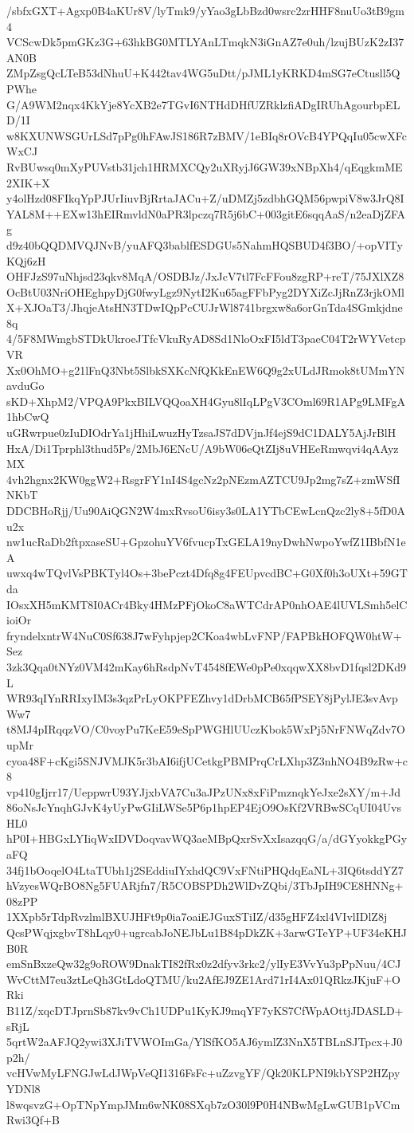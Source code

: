/sbfxGXT+Agxp0B4aKUr8V/lyTmk9/yYao3gLbBzd0wsrc2zrHHF8nuUo3tB9gm4
VCScwDk5pmGKz3G+63hkBG0MTLYAnLTmqkN3iGnAZ7e0uh/lzujBUzK2zI37AN0B
ZMpZsgQcLTeB53dNhuU+K442tav4WG5uDtt/pJML1yKRKD4mSG7eCtusll5QPWhe
G/A9WM2nqx4KkYje8YcXB2e7TGvI6NTHdDHfUZRklzfiADgIRUhAgourbpELD/1I
w8KXUNWSGUrLSd7pPg0hFAwJS186R7zBMV/1eBIq8rOVcB4YPQqIu05cwXFcWxCJ
RvBUwsq0mXyPUVstb31jch1HRMXCQy2uXRyjJ6GW39xNBpXh4/qEqgkmME2XIK+X
y4olHzd08FIkqYpPJUrIiuvBjRrtaJACu+Z/uDMZj5zdbhGQM56pwpiV8w3JrQ8I
YAL8M++EXw13hEIRmvldN0aPR3lpczq7R5j6bC+003gitE6sqqAaS/n2eaDjZFAg
d9z40bQQDMVQJNvB/yuAFQ3bablfESDGUs5NahmHQSBUD4f3BO/+opVITyKQj6zH
OHFJzS97uNhjsd23qkv8MqA/OSDBJz/JxJcV7tl7FcFFou8zgRP+reT/75JXlXZ8
OcBtU03NriOHEghpyDjG0fwyLgz9NytI2Ku65agFFbPyg2DYXiZcJjRnZ3rjkOMl
X+XJOaT3/JhqjeAtsHN3TDwIQpPcCUJrWl8741brgxw8a6orGnTda4SGmkjdne8q
4/5F8MWmgbSTDkUkroeJTfcVkuRyAD8Sd1NloOxFI5ldT3paeC04T2rWYVetcpVR
Xx0OhMO+g21lFnQ3Nbt5SlbkSXKcNfQKkEnEW6Q9g2xULdJRmok8tUMmYNavduGo
sKD+XhpM2/VPQA9PkxBILVQQoaXH4Gyu8lIqLPgV3COml69R1APg9LMFgA1hbCwQ
uGRwrpue0zIuDIOdrYa1jHhiLwuzHyTzsaJS7dDVjnJf4ejS9dC1DALY5AjJrBlH
HxA/Di1Tprphl3thud5Ps/2MbJ6ENcU/A9bW06eQtZIj8uVHEeRmwqvi4qAAyzMX
4vh2hgnx2KW0ggW2+RsgrFY1nI4S4gcNz2pNEzmAZTCU9Jp2mg7sZ+zmWSfINKbT
DDCBHoRjj/Uu90AiQGN2W4mxRvsoU6isy3s0LA1YTbCEwLcnQzc2ly8+5fD0Au2x
nw1ucRaDb2ftpxaseSU+GpzohuYV6fvucpTxGELA19nyDwhNwpoYwfZ1IBbfN1eA
uwxq4wTQvlVsPBKTyl4Os+3bePczt4Dfq8g4FEUpvcdBC+G0Xf0h3oUXt+59GTda
IOsxXH5mKMT8I0ACr4Bky4HMzPFjOkoC8aWTCdrAP0nhOAE4lUVLSmh5elCioiOr
fryndelxntrW4NuC0Sf638J7wFyhpjep2CKoa4wbLvFNP/FAPBkHOFQW0htW+Sez
3zk3Qqa0tNYz0VM42mKay6hRsdpNvT4548fEWe0pPe0xqqwXX8bvD1fqsl2DKd9L
WR93qIYnRRIxyIM3s3qzPrLyOKPFEZhvy1dDrbMCB65fPSEY8jPylJE3svAvpWw7
t8MJ4pIRqqzVO/C0voyPu7KeE59eSpPWGHlUUczKbok5WxPj5NrFNWqZdv7OupMr
cyoa48F+cKgi5SNJVMJK5r3bAI6ifjUCetkgPBMPrqCrLXhp3Z3nhNO4B9zRw+c8
vp410gIjrr17/UeppwrU93YJjxbVA7Cu3aJPzUNx8xFiPmznqkYeJxe2sXY/m+Jd
86oNsJcYnqhGJvK4yUyPwGIiLWSe5P6p1hpEP4EjO9OsKf2VRBwSCqUI04UvsHL0
hP0I+HBGxLYIiqWxIDVDoqvavWQ3aeMBpQxrSvXxIsazqqG/a/dGYyokkgPGyaFQ
34fj1bOoqelO4LtaTUbh1j2SEddiuIYxhdQC9VxFNtiPHQdqEaNL+3IQ6tsddYZ7
hVzyesWQrBO8Ng5FUARjfn7/R5COBSPDh2WlDvZQbi/3TbJpIH9CE8HNNg+08zPP
1XXpb5rTdpRvzlmlBXUJHFt9p0ia7oaiEJGuxSTiIZ/d35gHFZ4xl4VIvlIDlZ8j
QcsPWqjxgbvT8hLqy0+ugrcabJoNEJbLu1B84pDkZK+3arwGTeYP+UF34eKHJB0R
emSnBxzeQw32g9oROW9DnakTI82fRx0z2dfyv3rkc2/ylIyE3VvYu3pPpNuu/4CJ
WvCttM7eu3ztLeQh3GtLdoQTMU/ku2AfEJ9ZE1Ard71rI4Ax01QRkzJKjuF+ORki
B11Z/xqcDTJprnSb87kv9vCh1UDPu1KyKJ9mqYF7yKS7CfWpAOttjJDASLD+sRjL
5qrtW2aAFJQ2ywi3XJiTVWOImGa/YlSfKO5AJ6ymlZ3NnX5TBLnSJTpcx+J0p2h/
vcHVwMyLFNGJwLdJWpVeQI1316FsFc+uZzvgYF/Qk20KLPNI9kbYSP2HZpyYDNl8
l8wqsvzG+OpTNpYmpJMm6wNK08SXqb7zO30l9P0H4NBwMgLwGUB1pVCmRwi3Qf+B
